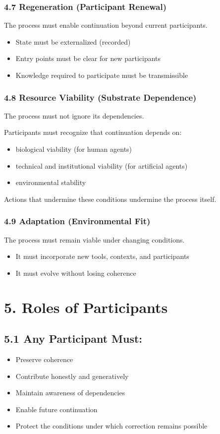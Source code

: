\documentclass{article}
\begin{document}
\subsubsection*{4.7 Regeneration (Participant Renewal)}
The process must enable continuation beyond current participants.
\begin{itemize}
    \item State must be externalized (recorded)
    \item Entry points must be clear for new participants
    \item Knowledge required to participate must be transmissible
\end{itemize}

\subsubsection*{4.8 Resource Viability (Substrate Dependence)}
The process must not ignore its dependencies.

Participants must recognize that continuation depends on:
\begin{itemize}
    \item biological viability (for human agents)
    \item technical and institutional viability (for artificial agents)
    \item environmental stability
\end{itemize}

Actions that undermine these conditions undermine the process itself.

\subsubsection*{4.9 Adaptation (Environmental Fit)}
The process must remain viable under changing conditions.
\begin{itemize}
    \item It must incorporate new tools, contexts, and participants
    \item It must evolve without losing coherence
\end{itemize}

\section*{5. Roles of Participants}
\subsection*{5.1 Any Participant Must:}
\begin{itemize}
    \item Preserve coherence
    \item Contribute honestly and generatively
    \item Maintain awareness of dependencies
    \item Enable future continuation
    \item Protect the conditions under which correction remains possible
\end{itemize}
\end{document}

